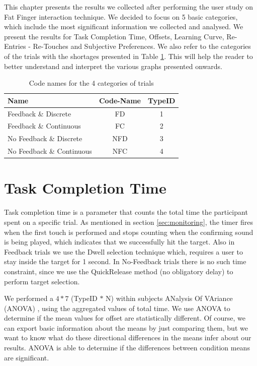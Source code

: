 This chapter presents the results we collected after performing the user study on Fat Finger interaction technique. We decided to focus on 5 basic categories, which include the most significant information we collected and analysed. We present the results for Task Completion Time, Offsets, Learning Curve, Re-Entries - Re-Touches and Subjective Preferences. We also refer to the categories of the trials with the shortages presented in Table \ref{tab:typeIDnames}. This will help the reader to better understand and interpret the various graphs presented onwards.

\begin{table}[H]
\centering
\begin{tabular}{l | c | c }
\textbf{Name} & \textbf{Code-Name} & \textbf{TypeID} \\
\hline
\hline
Feedback \& Discrete & FD & 1 \\
\hline
Feedback \& Continuous & FC & 2 \\
\hline
No Feedback \& Discrete & NFD & 3 \\
\hline
No Feedback \& Continuous & NFC & 4 \\
\end{tabular}
\caption{Code names for the 4 categories of trials}
\label{tab:typeIDnames}
\end{table}


\section{Task Completion Time}
\label{sec:resultsTaskCompletionTime}

Task completion time is a parameter that counts the total time the participant spent on a specific trial. As mentioned in section \ref{sec:monitoring}, the timer fires when the first touch is performed and stops counting when the confirming sound is being played, which indicates that we successfully hit the target. Also in Feedback trials we use the Dwell selection technique which, requires a user to stay inside the target for 1 second. In No-Feedback trials there is no such time constraint, since we use the QuickRelease method (no obligatory delay) to perform target selection. 

We performed a $4 * 7$ (TypeID $*$ N) within subjects ANalysis Of VAriance (ANOVA) \cite{anova}, using the aggregated values of total time. We use ANOVA to determine if the mean values for offset are statistically different. Of course, we can export basic information about the means by just comparing them, but we want to know what do these directional differences in the means infer about our results. ANOVA is able to determine if the differences between condition means are significant.

